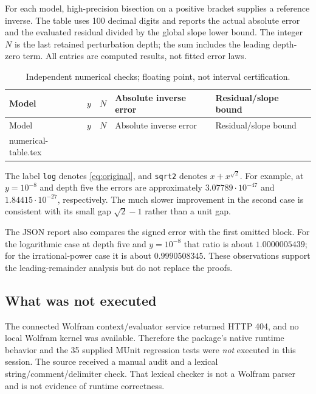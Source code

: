 \documentclass[11pt,a4paper]{article}
\makeatletter
\theoremstyle{definition}
\theoremstyle{remark}
\newcommand{\code}[1]{\texttt{#1}}
\newcommand{\tableinput}[1]{\@@input #1 }
\makeatother
\begin{document}
For each model, high-precision bisection on a positive bracket supplies a
reference inverse. The table uses 100 decimal digits and reports the actual
absolute error and the evaluated residual divided by the global slope lower
bound. The integer $N$ is the last retained perturbation depth; the sum includes
the leading depth-zero term. All entries are computed results, not fitted
error laws.

\begin{longtable}{@{}llrll@{}}
\caption{Independent numerical checks; floating point, not interval certification.}\label{tab:numerical}\\
\toprule Model & $y$ & $N$ & Absolute inverse error & Residual/slope bound\\\midrule\endfirsthead
\toprule Model & $y$ & $N$ & Absolute inverse error & Residual/slope bound\\\midrule\endhead
\tableinput{numerical-table.tex}
\bottomrule
\end{longtable}

The label \code{log} denotes \eqref{eq:original}, and \code{sqrt2} denotes
$x+x^{\sqrt2}$. For example, at $y=10^{-8}$ and depth five the errors are
approximately $3.07789\cdot10^{-47}$ and $1.84415\cdot10^{-27}$, respectively.
The much slower improvement in the second case is consistent with its small
gap $\sqrt2-1$ rather than a unit gap.

The JSON report also compares the signed error with the first omitted block.
For the logarithmic case at depth five and $y=10^{-8}$ that ratio is about
$1.0000005439$; for the irrational-power case it is about $0.9990508345$.
These observations support the leading-remainder analysis but do not replace
the proofs.

\subsection{What was not executed}

The connected Wolfram context/evaluator service returned HTTP 404, and no
local Wolfram kernel was available. Therefore the package's native runtime
behavior and the 35 supplied MUnit regression tests were \emph{not} executed
in this session. The source received a manual audit and a lexical
string/comment/delimiter check. That lexical checker is not a Wolfram parser
and is not evidence of runtime correctness.
\end{document}
